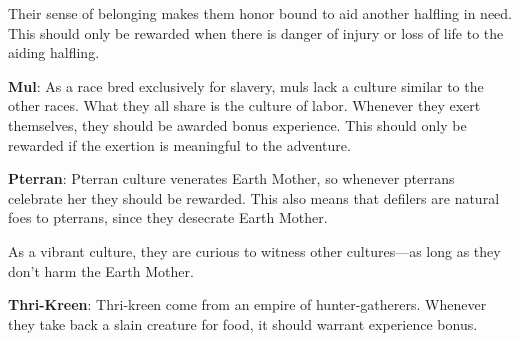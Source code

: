 Their sense of belonging makes them honor bound to aid another halfling in need. This should only be rewarded when there is danger of injury or loss of life to the aiding halfling.


\textbf{Mul}: As a race bred exclusively for slavery, muls lack a culture similar to the other races. What they all share is the culture of labor. Whenever they exert themselves, they should be awarded bonus experience. This should only be rewarded if the exertion is meaningful to the adventure.


\textbf{Pterran}: Pterran culture venerates Earth Mother, so whenever pterrans celebrate her they should be rewarded. This also means that defilers are natural foes to pterrans, since they desecrate Earth Mother.

As a vibrant culture, they are curious to witness other cultures---as long as they don't harm the Earth Mother.


\textbf{Thri-Kreen}: Thri-kreen come from an empire of hunter-gatherers. Whenever they take back a slain creature for food, it should warrant experience bonus.




